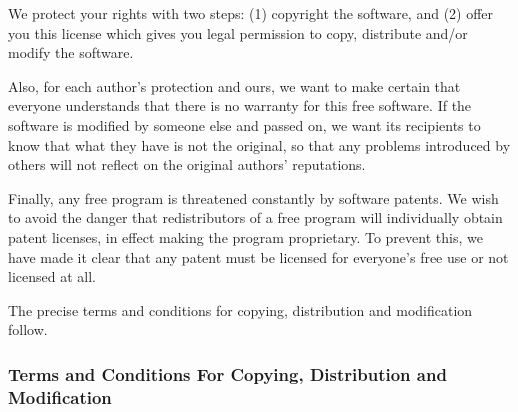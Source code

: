 We protect your rights with two steps: (1) copyright the software, and (2)
offer you this license which gives you legal permission to copy, distribute
and/or modify the software.

Also, for each author's protection and ours, we want to make certain that
everyone understands that there is no warranty for this free software.  If the
software is modified by someone else and passed on, we want its recipients to
know that what they have is not the original, so that any problems introduced
by others will not reflect on the original authors' reputations.

Finally, any free program is threatened constantly by software patents. We wish
to avoid the danger that redistributors of a free program will individually
obtain patent licenses, in effect making the program proprietary.  To prevent
this, we have made it clear that any patent must be licensed for everyone's
free use or not licensed at all.

The precise terms and conditions for copying, distribution and modification
follow.


\subsubsection{Terms and Conditions For Copying, Distribution and Modification}

